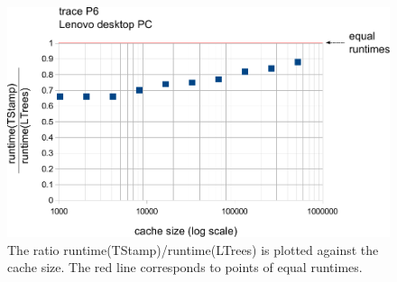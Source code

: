 \documentclass[a4paper,12pt, titlepage]{article}  %
\begin{document}
\begin{figure}[p]
	\centering
	\includegraphics[scale=0.8]{./experiments/lenovo_P6.pdf}
	\caption{The ratio runtime(TStamp)/runtime(LTrees) is plotted against the cache size.
                     The red line corresponds to points of equal runtimes.} 
	\label{fig:lenovo_P6}
\end{figure}
\end{document}
